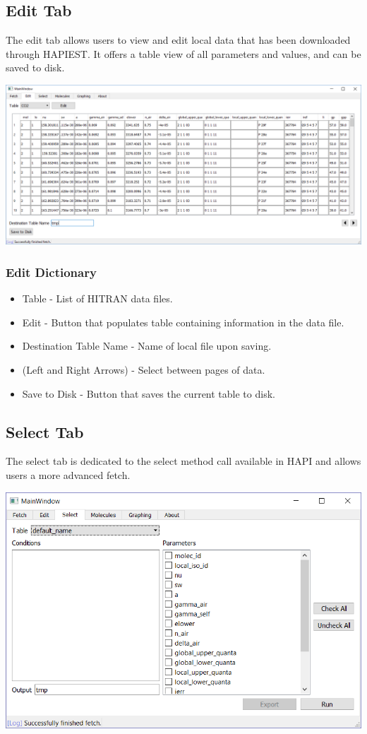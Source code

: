 \documentclass[12pt]{article}
\begin{document}
\subsection{Edit Tab}
The edit tab allows users to view and edit local data that has been downloaded through HAPIEST. It offers a table view of all parameters and values, and can be saved to disk.
\begin{center}
\includegraphics[scale = 0.4]{MainWindow_Edit}
\end{center}

\subsubsection*{Edit Dictionary}
\begin{itemize}
\item Table - List of HITRAN data files.
\item Edit - Button that populates table containing information in the data file.
\item Destination Table Name - Name of local file upon saving.
\item (Left and Right Arrows) - Select between pages of data.
\item Save to Disk - Button that saves the  current table to disk.
\end{itemize}

\subsection{Select Tab}
The select tab is dedicated to the select method call available in HAPI and allows users a more advanced fetch.
\begin{center}
\includegraphics[scale = 0.6]{MainWindow_Select}
\end{center}
\end{document}
